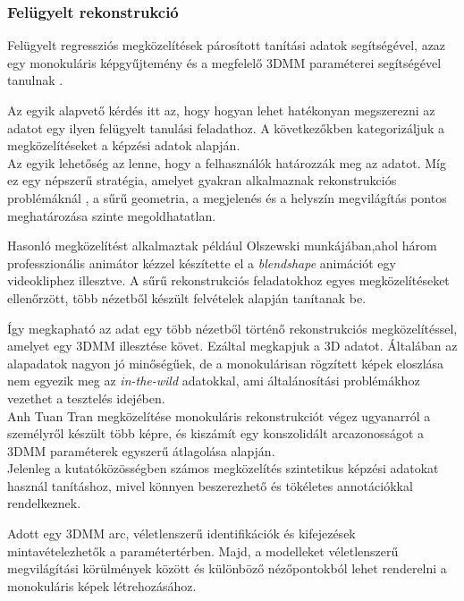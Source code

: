 \documentclass[12pt,a4]{article}
\begin{document}
	\subsubsection{Felügyelt rekonstrukció}
	Felügyelt regressziós megközelítések
	párosított tanítási adatok segítségével, azaz egy monokuláris  képgyűjtemény
	és a megfelelő 3DMM paraméterei segítségével tanulnak \cite{3dmm}.
	
	
	Az egyik alapvető kérdés itt az, hogy hogyan lehet hatékonyan megszerezni az adatot egy ilyen felügyelt tanulási feladathoz. A következőkben
	kategorizáljuk a megközelítéseket a
	képzési adatok alapján. \\
	
	
	Az egyik lehetőség az lenne, hogy a felhasználók határozzák meg az adatot. Míg ez egy népszerű stratégia, amelyet gyakran alkalmaznak rekonstrukciós problémáknál \cite{saragih}, 
	a sűrű geometria, a megjelenés és a helyszín megvilágítás pontos meghatározása szinte megoldhatatlan.
	
	
	Hasonló megközelítést alkalmaztak például Olszewski \cite{olszewski} munkájában,ahol három professzionális animátor kézzel készítette el a \textit{blendshape} animációt egy videokliphez illesztve. A sűrű rekonstrukciós feladatokhoz egyes megközelítéseket ellenőrzött, több nézetből készült felvételek alapján tanítanak be.
	
	
	Így megkapható az adat egy több nézetből történő rekonstrukciós megközelítéssel, amelyet egy 3DMM illesztése követ. Ezáltal  megkapjuk a 3D adatot. Általában az alapadatok nagyon jó minőségűek,
	de a monokulárisan rögzített képek eloszlása nem
	egyezik meg az \textit{in-the-wild} adatokkal, ami általánosítási problémákhoz vezethet
	a tesztelés idejében.\\
	
	
	Anh Tuan Tran megközelítése monokuláris rekonstrukciót végez ugyanarról a személyről készült több képre, és kiszámít egy konszolidált arcazonosságot a 3DMM paraméterek egyszerű átlagolása alapján. \\
	
	
	Jelenleg a kutatóközösségben számos megközelítés szintetikus képzési adatokat használ tanításhoz, mivel könnyen beszerezhető és tökéletes annotációkkal rendelkeznek. 
	
	
	Adott egy 3DMM arc, véletlenszerű identifikációk és kifejezések mintavételezhetők a paramétertérben. 
	Majd,
	a modelleket véletlenszerű megvilágítási körülmények között és különböző nézőpontokból lehet renderelni a monokuláris képek létrehozásához. 
	
\end{document}
